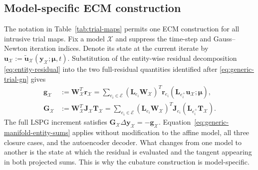 \documentclass[11pt]{article}
\newcommand{\utilde}{\widetilde{\mathbf u}}
\newcommand{\mub}{\bm\mu}
\begin{document}
\subsection{Model-specific ECM construction}
\label{sec:nonlinear-ecm}
The notation in Table~\ref{tab:trial-maps} permits one ECM construction for
all intrusive trial maps.  Fix a model $\mathcal X$ and suppress the
time-step and Gauss--Newton iteration indices.  Denote its state at the
current iterate by
$\mathbf u_{\mathcal X}:=
\utilde_{\mathcal X}(\mathbf y_{\mathcal X};\mub,t)$.
Substitution of the entity-wise residual decomposition
\eqref{eq:entity-residual} into the two full-residual quantities identified
after \eqref{eq:generic-trial-gn} gives
\begin{equation}
\begin{aligned}
\mathbf g_{\mathcal X}
&:=\mathbf W_{\mathcal X}^T\mathbf r_{\mathcal X}
=\sum_{e_i\in\mathcal E}
\left(\mathbf L_{e_i}\mathbf W_{\mathcal X}\right)^T
\mathbf r_{e_i}\!\left(
\mathbf L_{e_i^+}\mathbf u_{\mathcal X};\mub\right),\\
\mathbf G_{\mathcal X}
&:=\mathbf W_{\mathcal X}^T\mathbf J_{\mathcal X}
\mathbf T_{\mathcal X}
=\sum_{e_i\in\mathcal E}
\left(\mathbf L_{e_i}\mathbf W_{\mathcal X}\right)^T
\mathbf J_{e_i}
\left(\mathbf L_{e_i^+}\mathbf T_{\mathcal X}\right).
\end{aligned}
\label{eq:generic-manifold-entity-sums}
\end{equation}
The full LSPG increment satisfies
$\mathbf G_{\mathcal X}\Delta\mathbf y_{\mathcal X}
=-\mathbf g_{\mathcal X}$.  Equation~\eqref{eq:generic-manifold-entity-sums}
applies without modification to the affine model, all three closure cases,
and the autoencoder decoder.  What changes from one model to another is the
state at which the residual is evaluated and the tangent appearing in both
projected sums.  This is why the cubature construction is model-specific.
\end{document}
